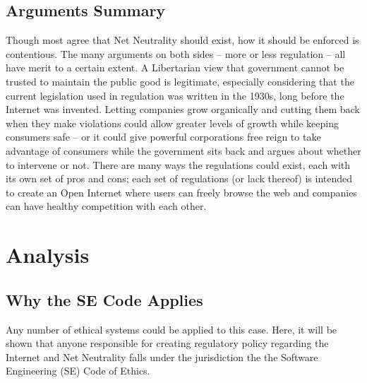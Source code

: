 \documentclass[12pt]{article}
\begin{document}
\begin{multicols}{2}
\subsection{Arguments Summary}
Though most agree that Net Neutrality should exist, how it should be enforced is contentious. The many arguments on both sides -- more or less regulation -- all have merit to a certain extent. A Libertarian view that government cannot be trusted to maintain the public good is legitimate, especially considering that the current legislation used in regulation was written in the 1930s, long before the Internet was invented. \cite{pbs-pai-makes-case, forbes-libertarian} Letting companies grow organically and cutting them back when they make violations could allow greater levels of growth while keeping consumers safe -- or it could give powerful corporations free reign to take advantage of consumers while the government sits back and argues about whether to intervene or not. \cite{npr-pai-makes-case, eff-pro-net} There are many ways the regulations could exist, each with its own set of pros and cons; each set of regulations (or lack thereof) is intended to create an Open Internet where users can freely browse the web and companies can have healthy competition with each other.

\section{Analysis}


\subsection{Why the SE Code Applies}
Any number of ethical systems could be applied to this case. Here, it will be shown that anyone responsible for creating regulatory policy regarding the Internet and Net Neutrality falls under the jurisdiction the the Software Engineering (SE) Code of Ethics.

\end{multicols}
\end{document}
